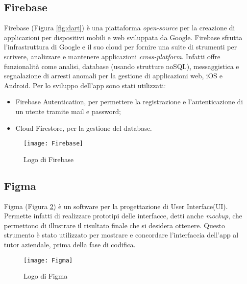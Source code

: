 \subsection{Firebase}
Firebase (Figura \ref{fig:dart}) è una piattaforma \emph{open-source} per la creazione di applicazioni per dispositivi mobili e web sviluppata da Google.\newline
Firebase sfrutta l'infrastruttura di Google e il suo cloud per fornire una suite di strumenti per scrivere, analizzare e mantenere applicazioni \emph{cross-platform}.\newline
Infatti offre funzionalità come analisi, database (usando strutture noSQL), messaggistica e segnalazione di arresti anomali per la gestione di applicazioni web, iOS e Android.\newline
Per lo sviluppo dell'app sono stati utilizzati:
\begin{itemize}
    \item Firebase Autentication, per permettere la registrazione e l'autenticazione di un utente tramite mail e password;
    \item Cloud Firestore, per la gestione del database.
\end{itemize}
\begin{figure}[!h] 
    \centering 
    \texttt{[image: Firebase]} 
    \caption{Logo di Firebase}\label{fig:figma}
\end{figure}

\subsection{Figma}
Figma (Figura \ref{fig:figma}) è un software per la progettazione di User Interface(UI).\newline
Permette infatti di realizzare prototipi delle interfacce, detti anche \emph{mockup}, che permettono di illustrare il risultato finale che si desidera ottenere.\newline
Questo strumento è stato utilizzato per mostrare e concordare l'interfaccia dell'app al tutor aziendale, prima della fase di codifica.\newline
\begin{figure}[!h] 
    \centering 
    \texttt{[image: Figma]} 
    \caption{Logo di Figma}\label{fig:figma}
\end{figure}

